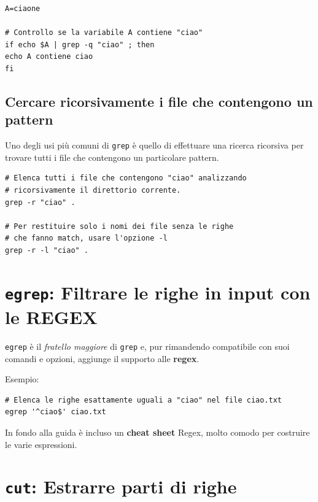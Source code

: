 \documentclass[a4paper]{report}
\newenvironment{info}{\begin{tcolorbox}[fonttitle=\sffamily\bfseries\large,title=Info,colframe=blue!75!white]}{\end{tcolorbox}}
\newenvironment{code}{\begin{tcolorbox}[size=small]}{\end{tcolorbox}}
\begin{document}
\begin{code}
\begin{lstlisting}
A=ciaone

# Controllo se la variabile A contiene "ciao"
if echo $A | grep -q "ciao" ; then
echo A contiene ciao
fi
\end{lstlisting}
\end{code}

\subsection{Cercare ricorsivamente i file che contengono un pattern}
Uno degli usi più comuni di \texttt{grep} è quello di effettuare una ricerca ricorsiva per trovare tutti i file che contengono un particolare pattern.

\begin{code}
\begin{lstlisting}
# Elenca tutti i file che contengono "ciao" analizzando
# ricorsivamente il direttorio corrente.
grep -r "ciao" .

# Per restituire solo i nomi dei file senza le righe
# che fanno match, usare l'opzione -l
grep -r -l "ciao" .
\end{lstlisting}
\end{code}

\section{\texttt{egrep}: Filtrare le righe in input con le REGEX}

\texttt{egrep} è il \textit{fratello maggiore} di \texttt{grep} e, pur rimandendo compatibile con suoi comandi e opzioni, aggiunge il supporto alle \textbf{regex}.

Esempio:

\begin{code}
\begin{lstlisting}
# Elenca le righe esattamente uguali a "ciao" nel file ciao.txt
egrep '^ciao$' ciao.txt
\end{lstlisting}
\end{code}

\begin{info}
	In fondo alla guida è incluso un \textbf{cheat sheet} Regex, molto comodo per costruire le varie espressioni.
\end{info}

\section{\texttt{cut}: Estrarre parti di righe}
\end{document}
